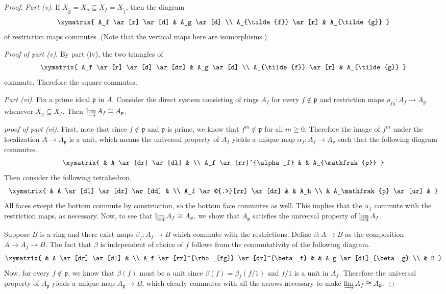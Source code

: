 \begin{proof}
\emph{Part (v)}.
If $ X_{\tilde{g}} = X_g \subseteq X_f = X_{\tilde{f}}$, then
the diagram
\[ \xymatrix{
A_f \ar[r] \ar[d] & A_g \ar[d] \\
A_{\tilde{f}} \ar[r] & A_{\tilde{g}}
} \]
of restriction maps commutes. (Note that the vertical maps here
are isomorphisms.)

\emph{Proof of part (v)}.
By part (iv), the two triangles of
\[ \xymatrix{
A_f \ar[r] \ar[d] \ar[dr] & A_g \ar[d] \\
A_{\tilde{f}} \ar[r] & A_{\tilde{g}}
} \]
commute. Therefore the square commutes.

\emph{Part (vi)}.
Fix a prime ideal $ \mathfrak{p}$ in $ A$. Consider the direct
system consisting of rings $ A_f$ for every $ f \notin
\mathfrak{p}$ and restriction maps $ \rho_{fg} : A_f \to A_g$
whenever $ X_g \subseteq X_f$. Then $ \varinjlim A_f \cong
A_{\mathfrak{p}}$.

\emph{proof of part (vi)}.
First, note that since $ f \notin \mathfrak{p}$ and $
\mathfrak{p}$ is prime, we know that $ f^m \notin \mathfrak{p}$
for all $ m \geq 0$. Therefore the image of $ f^m$ under the
localization $ A \to A_\mathfrak{p}$ is a unit, which means the
universal property of $ A_f$ yields a unique map $ \alpha_f :
A_f \to A_\mathfrak{p}$ such that the following diagram
commutes.
\[ \xymatrix{
& A \ar[dr] \ar[dl] & \\
A_f \ar[rr]^{\alpha_f} & & A_{\mathfrak{p}}
} \]
Then consider the following tetrahedron.
\[ \xymatrix{
& A \ar[dl] \ar[dr] \ar[dd] & \\
A_f \ar@{.>}[rr] \ar[dr] & & A_h \\
& A_\mathfrak{p} \ar[ur] &
} \]
All faces except the bottom commute by construction, so the
bottom face commutes as well. This implies that the $ \alpha_f$
commute with the restriction maps, as necessary. Now, to see
that $ \varinjlim A_f \cong A_\mathfrak{p}$, we show that $
A_\mathfrak{p}$ satisfies the universal property of $ \varinjlim
A_f$.

Suppose $ B$ is a ring and there exist maps $ \beta_f : A_f \to
B$ which commute with the restrictions. Define $ \beta : A \to
B$ as the composition $ A \to A_f \to B$. The fact that $ \beta$
is independent of choice of $ f$ follows from the commutativity
of the following diagram.
\[ \xymatrix{
& A \ar[dr] \ar[dl] & \\
A_f \ar[rr]^{\rho_{fg}} \ar[dr]^{\beta_f} & & A_g
\ar[dl]_{\beta_g} \\
& B
} \]
Now, for every $ f \notin \mathfrak{p}$, we know that $
\beta(f)$ must be a unit since $ \beta(f) = \beta_f(f/1)$ and $
f/1$ is a unit in $ A_f$. Therefore the universal property of $
A_\mathfrak{p}$ yields a unique map $ A_{\mathfrak{p}} \to B$,
which clearly commutes with all the arrows necessary to make $
\varinjlim A_f \cong A_\mathfrak{p}$.
\end{proof}


